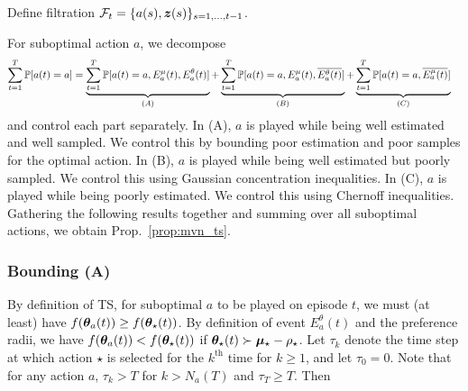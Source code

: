 \begin{definition}[Filtration $\cF_t$]
    Define filtration $\cF_t = \{ a(s), \bsz(s) \}_{s = 1, \dots, t-1 }$.
\end{definition}

For suboptimal action $a$, we decompose
\begin{align*}
    \sum_{t=1}^T \Pr[a(t) = a]
    & = \underbrace{\sum_{t=1}^T \Pr[a(t) = a, E_a^\mu(t), E_a^\theta(t)]}_{\text(A)}
    + \underbrace{\sum_{t=1}^T \Pr[a(t) = a, E_a^\mu(t), \overline{E_a^\theta(t)}]}_{\text(B)}
    + \underbrace{\sum_{t=1}^T \Pr[a(t) = a, \overline{E_a^\mu(t)}]}_{\text(C)}
\end{align*}
and control each part separately. In (A), $a$ is played while being well estimated and well sampled. We control this by bounding poor estimation and poor samples for the optimal action. In (B), $a$ is played while being well estimated but poorly sampled. We control this using Gaussian concentration inequalities. In (C), $a$ is played while being poorly estimated. We control this using Chernoff inequalities. Gathering the following results together
and summing over all suboptimal actions, we obtain Prop.~\ref{prop:mvn_ts}.


\subsubsection{Bounding (A)}

By definition of TS, for suboptimal $a$ to be played on episode $t$, we must (at least) have $f(\bstheta_a(t)) \geq f(\bstheta_\star(t))$. By definition of event $E_a^\theta(t)$ and the preference radii, we have $f(\bstheta_a(t)) < f(\bstheta_\star(t))$ if $\bstheta_\star(t) \succ \bsmu_\star - \rho_\star$. Let $\tau_k$ denote the time step at which action $\star$ is selected for the $k^\mathrm{th}$ time for $k \geq 1$, and let $\tau_0 = 0$. Note that for any action $a$, $\tau_k > T$ for $k > N_a(T)$ and $\tau_T \geq T$. Then


